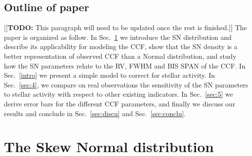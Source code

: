 \documentclass[11pt, oneside]{article}
\newcommand{\todo}[1]{{\color{cyan}[[\textbf{TODO: }#1]]}}
\begin{document}
\subsection{Outline of paper}
\todo{This paragraph will need to be updated once the rest is finished.} The paper is organized as follow. In Sec.~\ref{sec:2} we introduce the SN distribution and describe its applicability for modeling the CCF,  show that the SN density is a better representation of observed CCF than a Normal distribution, and study how the SN parameters relate to the RV, FWHM and BIS SPAN of the CCF. In Sec.~\ref{intro} we present a simple model to correct for stellar activity. In Sec.~\ref{sec:4}, we compare on real observations the sensitivity of the SN parameters to stellar activity with respect to other existing indicators. In Sec.~\ref{sec:5} we derive error bars for the different CCF parameters, and finally we discuss our results and conclude in Sec.~\ref{sec:discu} and Sec.~\ref{sec:conclu}.



\section{The Skew Normal distribution} \label{sec:2}
\end{document}
